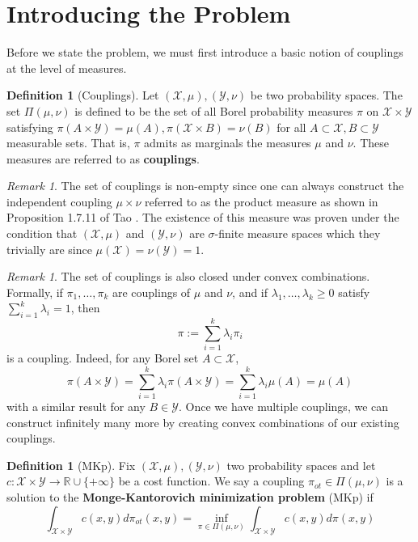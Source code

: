 \documentclass[11pt]{amsart}
\theoremstyle{definition}                  %
\newtheorem{definition}[theorem]{Definition}
\theoremstyle{remark}                      %
\newtheorem{remark}[theorem]{Remark}
\begin{document}
\section{Introducing the Problem}
Before we state the problem, we must first introduce a basic notion of couplings at the level of measures.
\begin{definition}[Couplings]
    Let $(\mathcal{X},\mu), (\mathcal{Y}, \nu)$ be two probability spaces. The set $\Pi(\mu,\nu)$ is defined to be the set of all Borel probability
    measures $\pi$ on $\mathcal{X} \times \mathcal{Y}$ satisfying  $\pi(A \times \mathcal{Y}) = \mu(A), \pi(\mathcal{X} \times B) = \nu(B)$ for all $A \subset \mathcal{X}, B \subset \mathcal{Y}$ measurable sets.
    That is, $\pi$ admits as marginals the measures $ \mu $ and $\nu$. These measures are referred to as \textbf{couplings}.
\end{definition}
\begin{remark}
The set of couplings is non-empty since one can always construct the independent coupling $\mu \times \nu$ referred to as the product measure as shown in Proposition 1.7.11 of Tao \citep{Tao2011Measure}. The existence
of this measure was proven under the condition that $(\mathcal{X}, \mu)$ and $(\mathcal{Y}, \nu)$ are  $\sigma$-finite measure spaces which they trivially are since $\mu(\mathcal{X}) = \nu(\mathcal{Y}) = 1$.
\end{remark}
\begin{remark}
    The set of couplings is also closed under convex combinations. Formally, if $\pi_1,\dots,\pi_k$ are couplings of $\mu$ and $\nu$, and
     if $\lambda_1, \dots, \lambda_k \ge 0$ satisfy $\sum_{i=1}^{k}\lambda_i = 1$, then
     \[
     \pi := \sum_{i=1}^{k}\lambda_i\pi_i
     \] 
     is a coupling. Indeed, for any Borel set $A \subset \mathcal{X}$,
     \[
     \pi(A \times \mathcal{Y}) = \sum_{i=1}^{k}\lambda_i \pi(A \times \mathcal{Y}) = \sum_{i=1}^{k}\lambda_i \mu(A) = \mu(A)
     \] 
     with a similar result for any $B \in \mathcal{Y}$. Once we have multiple couplings, we can construct infinitely many more by creating convex combinations of our existing couplings.
\end{remark}

\begin{definition}[MKp]\label{def:MKp}
    Fix $( \mathcal{X}, \mu), (\mathcal{Y}, \nu)$ two probability spaces and let $c: \mathcal{X} \times \mathcal{Y} \rightarrow  \mathbb{R} \cup \{+\infty\}$ be a cost function. 
    We say a coupling $\pi_{ot} \in \Pi(\mu,\nu)$ is a solution to the \textbf{Monge-Kantorovich minimization problem} (MKp) if 
\begin{equation}\label{MKp}
    \int_{\mathcal{X} \times \mathcal{Y}}^{}c(x,y)d\pi_{ot}(x,y) = \inf_{\pi \in \Pi(\mu,\nu)} \int_{ \mathcal{X} \times \mathcal{Y}}^{}c(x,y)d\pi(x,y)
\end{equation}
\end{definition}
\end{document}
